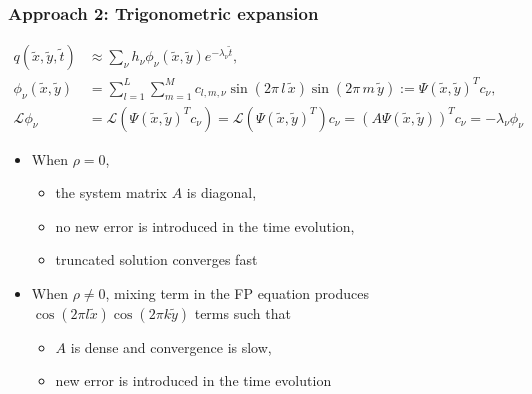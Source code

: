 \documentclass{beamer}
\begin{document}
\begin{frame}
  \frametitle{Approach 2: Trigonometric expansion}
  \begin{align*}
    q(\tilde{x},\tilde{y},\tilde{t}) &\approx  \sum_\nu h_\nu \phi_\nu (\tilde{x}, \tilde{y}) e^{-\lambda_\nu \tilde{t}}, \\
    \phi_\nu(\tilde{x},\tilde{y}) &= \sum_{l=1}^L \sum_{m=1}^M c_{l,m, \nu}
                                    \sin\left(2\pi\, l\, \tilde{x} \right) \sin\left(2\pi\, m\, \tilde{y} \right) := \Psi(\tilde{x},\tilde{y})^T c_\nu, \\
    \mathcal{L}\phi_\nu &= \mathcal{L}(\Psi(\tilde{x},\tilde{y})^T c_\nu) =
  \mathcal{L}(\Psi(\tilde{x},\tilde{y})^T) c_\nu = (A \Psi(\tilde{x},\tilde{y}))^T c_\nu = -\lambda_\nu \phi_\nu
  \end{align*}
  \begin{itemize}
  \item When $\rho = 0$,
    \begin{itemize}
    \item the system matrix $A$ is diagonal,
    \item no new error is introduced in the time evolution,
    \item truncated solution converges fast
    \end{itemize}
  \item When $\rho \neq 0$, mixing term in the FP equation produces
    $\cos(2\pi l \tilde{x})\cos(2\pi k \tilde{y})$ terms such that
    \begin{itemize}
    \item $A$ is dense and convergence is slow,
    \item new error is introduced in the time evolution
    \end{itemize}
  \end{itemize}
\end{frame}
\end{document}
